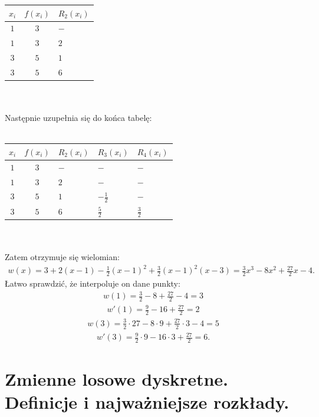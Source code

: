 \documentclass[12pt]{article}
\begin{document}
    \begin{tabular}{|c|c|l|}
        \hline
        $x_i$ & $f(x_i)$ & $R_2(x_i)$ \\ \hline
        $1$ & $3$ & $-$ \\ \hline
        $1$ & $3$ & $2$ \\ \hline
        $3$ & $5$ & $1$ \\ \hline
        $3$ & $5$ & $6$ \\ \hline
    \end{tabular}\\\\
    Następnie uzupełnia się do końca tabelę:\\\\
    \begin{tabular}{|c|c|l|l|l|}
        \hline
        $x_i$ & $f(x_i)$ & $R_2(x_i)$ & $R_3(x_i)$ & $R_4(x_i)$ \\ \hline
        $1$ & $3$ & $-$ & $-$ & $-$ \\ \hline
        $1$ & $3$ & $2$ & $-$ & $-$ \\ \hline
        $3$ & $5$ & $1$ & $-\frac{1}{2}$ & $-$ \\ \hline
        $3$ & $5$ & $6$ & $\frac{5}{2}$ & $\frac{3}{2}$ \\ \hline
    \end{tabular}\\\\
    Zatem otrzymuje się wielomian:
    \begin{align*}
        w(x)=3+2(x-1)-{\frac {1}{2}}(x-1)^{2}+{\frac {3}{2}}(x-1)^{2}(x-3)={\frac {3}{2}}x^{3}-8x^{2}+{\frac {27}{2}}x-4.
    \end{align*}
    Łatwo sprawdzić, że interpoluje on dane punkty:
    \begin{align*}
        w(1)=\frac{3}{2}-8+\frac{27}{2}-4=3
    \end{align*}
    \begin{align*}
        w'(1)={\frac {9}{2}}-16+{\frac {27}{2}}=2
    \end{align*}
    \begin{align*}
        w(3)={\frac {3}{2}}\cdot 27-8\cdot 9+{\frac {27}{2}}\cdot 3-4=5
    \end{align*}
    \begin{align*}
        w'(3)={\frac {9}{2}}\cdot 9-16\cdot 3+{\frac {27}{2}}=6.
    \end{align*}


    \newpage

    \section{Zmienne losowe dyskretne. Definicje i najważniejsze rozkłady.}
\end{document}
